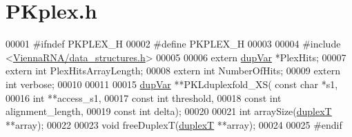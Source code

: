 \hypertarget{PKplex_8h_source}{}\section{P\+Kplex.\+h}
\label{PKplex_8h_source}

\begin{DoxyCode}
00001 \textcolor{preprocessor}{#ifndef PKPLEX\_H}
00002 \textcolor{preprocessor}{#define PKPLEX\_H}
00003 
00004 \textcolor{preprocessor}{#include <\mbox{\hyperlink{data__structures_8h}{ViennaRNA/data\_structures.h}}>}
00005 
00006 \textcolor{keyword}{extern} \mbox{\hyperlink{group__data__structures_structdupVar}{dupVar}} *PlexHits;
00007 \textcolor{keyword}{extern} \textcolor{keywordtype}{int}    PlexHitsArrayLength;
00008 \textcolor{keyword}{extern} \textcolor{keywordtype}{int}    NumberOfHits;
00009 \textcolor{keyword}{extern} \textcolor{keywordtype}{int}    verbose;
00010 
00011 
00015 \mbox{\hyperlink{group__data__structures_structdupVar}{dupVar}}  **PKLduplexfold\_XS( \textcolor{keyword}{const} \textcolor{keywordtype}{char} *s1,
00016                             \textcolor{keywordtype}{int} **access\_s1,
00017                             \textcolor{keyword}{const} \textcolor{keywordtype}{int} threshold,
00018                             \textcolor{keyword}{const} \textcolor{keywordtype}{int} alignment\_length,
00019                             \textcolor{keyword}{const} \textcolor{keywordtype}{int} delta);
00020 
00021 \textcolor{keywordtype}{int}     arraySize(\mbox{\hyperlink{group__data__structures_structduplexT}{duplexT}} **array);
00022 
00023 \textcolor{keywordtype}{void}    freeDuplexT(\mbox{\hyperlink{group__data__structures_structduplexT}{duplexT}} **array);
00024 
00025 \textcolor{preprocessor}{#endif}
\end{DoxyCode}
